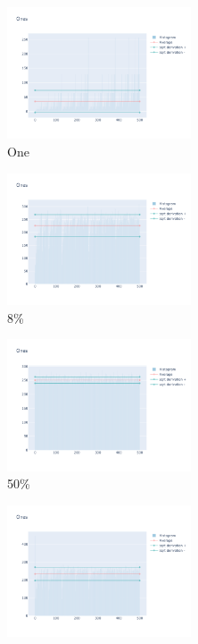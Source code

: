 \documentclass[12pt, fleqn]{report}                             %
\theoremstyle{break}                                            %
\begin{document}
      \begin{figure}[ht!]
        \centering
        \begin{subfigure}[b]{0.4\linewidth}
          \includegraphics[width=0.6\textwidth]{Images/60/dia-a.png}
          \caption{One}
        \end{subfigure}
        \begin{subfigure}[b]{0.4\linewidth}
          \includegraphics[width=0.6\textwidth]{Images/60/dia-b.png}
          \caption{8\%}
        \end{subfigure}
        \begin{subfigure}[b]{0.4\linewidth}
          \includegraphics[width=0.6\textwidth]{Images/60/dia-c.png}
          \caption{50\%}
        \end{subfigure}
        \begin{subfigure}[b]{0.4\linewidth}
          \includegraphics[width=0.6\textwidth]{Images/60/dia-d.png}

\end{subfigure}
\end{figure}
\end{document}
